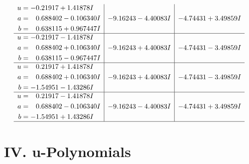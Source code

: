 \documentclass[1p]{elsarticle_modified}
\theoremstyle{definition}
\begin{document}
$$\begin{array}{c|c|c}
\begin{aligned}
u &= -0.21917 + 1.41878 I \\
a &= \phantom{-}0.688402 - 0.106340 I \\
b &= \phantom{-}0.638115 + 0.967447 I\end{aligned}
 & -9.16243 - 4.40083 I & -4.74431 + 3.49859 I \\ \hline\begin{aligned}
u &= -0.21917 - 1.41878 I \\
a &= \phantom{-}0.688402 + 0.106340 I \\
b &= \phantom{-}0.638115 - 0.967447 I\end{aligned}
 & -9.16243 + 4.40083 I & -4.74431 - 3.49859 I \\ \hline\begin{aligned}
u &= \phantom{-}0.21917 + 1.41878 I \\
a &= \phantom{-}0.688402 + 0.106340 I \\
b &= -1.54951 - 1.43286 I\end{aligned}
 & -9.16243 + 4.40083 I & -4.74431 - 3.49859 I \\ \hline\begin{aligned}
u &= \phantom{-}0.21917 - 1.41878 I \\
a &= \phantom{-}0.688402 - 0.106340 I \\
b &= -1.54951 + 1.43286 I\end{aligned}
 & -9.16243 - 4.40083 I & -4.74431 + 3.49859 I\\
 \hline 
 \end{array}$$\newpage
\newpage\renewcommand{\arraystretch}{1}
\centering \section*{ IV. u-Polynomials}
\end{document}
